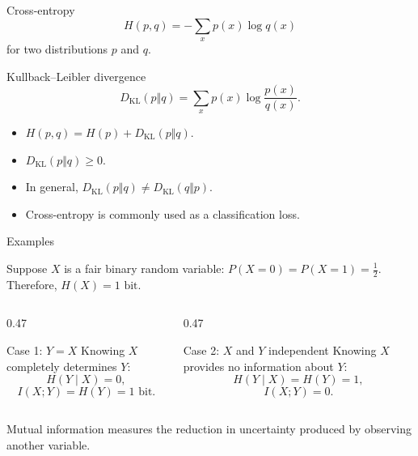 \documentclass[aspectratio=169,12pt]{beamer}
\begin{document}
\begin{frame}[t]
	\vspace{0.2cm}
	
	\begin{block}{Cross-entropy}
		\[
		H(p,q)
		=
		-\sum_x p(x)\log q(x)
		\]
for two distributions $p$ and $q$.
	\end{block}
	
	\begin{block}{Kullback--Leibler divergence}
		\[
		D_{\mathrm{KL}}(p\Vert q)
		=
		\sum_x p(x)\log\frac{p(x)}{q(x)}.
		\]
	\end{block}

	
	\begin{itemize}
		\item 	$H(p,q)
		=
		H(p)+D_{\mathrm{KL}}(p\Vert q)$.
		\item $D_{\mathrm{KL}}(p\Vert q)\geq 0$.
		\item In general,
		$D_{\mathrm{KL}}(p\Vert q)\neq D_{\mathrm{KL}}(q\Vert p)$.
		\item Cross-entropy is commonly used as a classification loss.
	\end{itemize}
\end{frame}

\begin{frame}[t]{Examples}
	\vspace{0.2cm}
	
	Suppose $X$ is a fair binary random variable: $
	P(X=0)=P(X=1)=\frac{1}{2}$.
	Therefore, $
	H(X)=1\text{ bit}$.
	
	\begin{columns}[T,onlytextwidth]
		
		\begin{column}{0.47\textwidth}
			\begin{block}{Case 1: $Y=X$}
				Knowing $X$ completely determines $Y$:
				\[
				H(Y\mid X)=0,
				\]
				\[
				I(X;Y)=H(Y)=1\text{ bit}.
				\]
			\end{block}
		\end{column}
		
		\begin{column}{0.47\textwidth}
			\begin{block}{Case 2: $X$ and $Y$ independent}
				Knowing $X$ provides no information about $Y$:
				\[
				H(Y\mid X)=H(Y)=1,
				\]
				\[
				I(X;Y)=0.
				\]
			
			\end{block}
		\end{column}
		
	\end{columns}
	
	\vspace{0.25cm}
	
	\begin{center}
		\small
		Mutual information measures the reduction in uncertainty
		produced by observing another variable.
	\end{center}
\end{frame}
\end{document}

